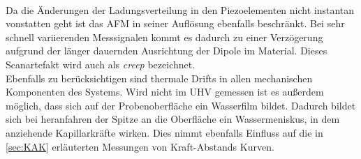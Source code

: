 \\
Da die Änderungen der Ladungsverteilung in den Piezoelementen nicht instantan vonstatten geht ist das AFM in seiner Auflösung ebenfalls beschränkt. Bei sehr schnell variierenden Messsignalen kommt es dadurch zu einer Verzögerung aufgrund der länger dauernden Ausrichtung der Dipole im Material. Dieses Scanartefakt wird auch als \textit{creep} bezeichnet.
\\
Ebenfalls zu berücksichtigen sind thermale Drifts in allen mechanischen Komponenten des Systems. Wird nicht im UHV gemessen ist es außerdem möglich, dass sich auf der Probenoberfläche ein Wasserfilm bildet. Dadurch bildet sich bei heranfahren der Spitze an die Oberfläche ein Wassermeniskus, in dem anziehende Kapillarkräfte wirken. Dies nimmt ebenfalls Einfluss auf die in \autoref{sec:KAK} erläuterten Messungen von Kraft-Abstands Kurven.\\
\newpage
